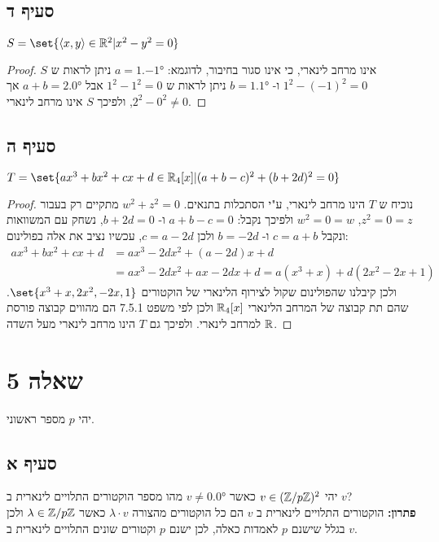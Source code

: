 \documentclass{article}
\DeclarePairedDelimiter\set\{\}
\begin{document}
		\subsection*{סעיף ד}
		$S = \set{\ang{x,y} \in \RR^2 | x^2 - y^2 = 0}$
		\begin{proof}
			$S$ אינו מרחב לינארי, כי אינו סגור בחיבור, לדוגמא: $a = \ang{1, -1}$ ניתן לראות ש $1^2 - (-1)^2 = 0$ ו- $b = \ang{1,1}$ ניתן לראות ש $1^2 - 1^2 = 0$
		אבל $a + b = \ang{2, 0}$ אך $2^2 - 0^2 \neq 0$, ולפיכך $S$ אינו מרחב לינארי.
		\end{proof}

		\subsection*{סעיף ה}
		$T = \set{ax^3 + bx^2 + cx + d \in \RR_4[x] | (a+b-c)^2 + (b + 2d)^2 = 0}$
		\begin{proof}
			נוכיח ש $T$ הינו מרחב לינארי, ע"י הסתכלות בתנאים.
			$w^2 + z^2 = 0$ מתקיים רק בעבור $z^2 = 0 = z$, $w^2 = 0 = w$ ולפיכך נקבל:
			$a+b-c = 0$ ו- $b+2d = 0$, נשחק עם המשוואות ונקבל $c = a + b$ ו- $b = -2d$ ולכן $c = a - 2d$, עכשיו נציב את אלה בפולינום:
			\begin{align*}
			ax^3 + bx^2 + cx + d &= ax^3 -2dx^2 + (a-2d)x + d \\
			&= ax^3 - 2dx^2 + ax - 2dx + d = a(x^3 + x) + d(2x^2 - 2x + 1)
		\end{align*}
			ולכן קיבלנו שהפולינום שקול לצירוף הלינארי של הוקטורים $\set{x^3 + x, 2x^2, -2x, 1}$.
			שהם תת קבוצה של המרחב הלינארי $\mathbb{R}_4[x]$ ולכן לפי משפט 7.5.1 הם מהווים קבוצה פורסת למרחב לינארי. ולפיכך גם $T$ הינו מרחב לינארי מעל השדה $\mathbb{R}$.
		\end{proof}

		\section*{שאלה 5}
		יהי $p$ מספר ראשוני.
		\subsection*{סעיף א}
		יהי $v \in (\mathbb{Z} / p\mathbb{Z})^2$ כאשר $v \neq \ang{0,0}$ מהו מספר הוקטורים התלויים לינארית ב $v$? \\
		\textbf{פתרון:} הוקטורים התלויים לינארית ב $v$ הם כל הוקטורים מהצורה $\lambda \cdot v$ כאשר $\lambda \in \mathbb{Z} / p\mathbb{Z}$
		ולכן בגלל שישנם $p$ לאמדות כאלה, לכן ישנם $p$ וקטורים שונים התלויים לינארית ב $v$.
\end{document}
